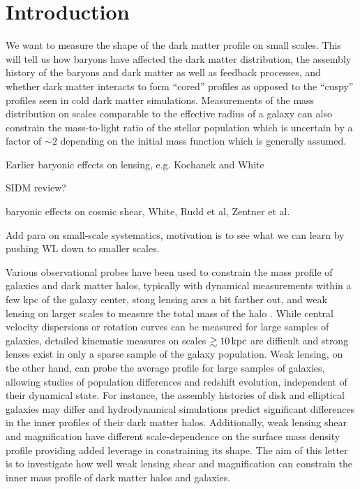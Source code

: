 \documentclass[12pt]{emulateapj}
\begin{document}
\section{Introduction}

We want to measure the shape of the dark matter profile on small
scales. This will tell us how baryons have affected the dark matter
distribution, the assembly history of the baryons and dark matter as
well as feedback processes, and whether dark matter interacts to form
``cored'' profiles as opposed to the ``cuspy'' profiles seen in cold
dark matter simulations. Measurements of the mass distribution on
scales comparable to the effective radius of a galaxy can also
constrain the mass-to-light ratio of the stellar population which is
uncertain by a factor of $\sim2$ depending on the initial mass
function which is generally assumed.

Earlier baryonic effects on lensing, e.g. Kochanek and White
 
SIDM review?

baryonic effects on cosmic shear, White, Rudd et al, Zentner et al.

Add para on small-scale systematics, motivation is to see what we
can learn by pushing WL down to smaller scales.

Various observational probes have been used to constrain the mass
profile of galaxies and dark matter halos, typically with dynamical
measurements within a few kpc of the galaxy center, stong lensing arcs
a bit farther out, and weak lensing on larger scales to measure the
total mass of the halo \citep[e.g.,][]{Sand2004, Koopmans2006,
  Gavazzi2007, Jiang2007, Auger2010, Schulz2010, Newman2013a}.  While
central velocity dispersions or rotation curves can be measured for
large samples of galaxies, detailed kinematic measures on scales
$\gtrsim10\,{\rm kpc}$ are difficult and strong lenses exist in only a sparse
sample of the galaxy population. Weak lensing, on the other hand, can
probe the average profile for large samples of galaxies, allowing
studies of population differences and redshift evolution, independent
of their dynamical state. For instance, the assembly histories of disk
and elliptical galaxies may differ and hydrodynamical simulations
predict significant differences in the inner profiles of their dark
matter halos. Additionally, weak lensing shear and magnification have
different scale-dependence on the surface mass density profile
providing added leverage in constraining its shape. The aim of this
letter is to investigate how well weak lensing shear and magnification
can constrain the inner mass profile of dark matter halos and
galaxies.
\end{document}

